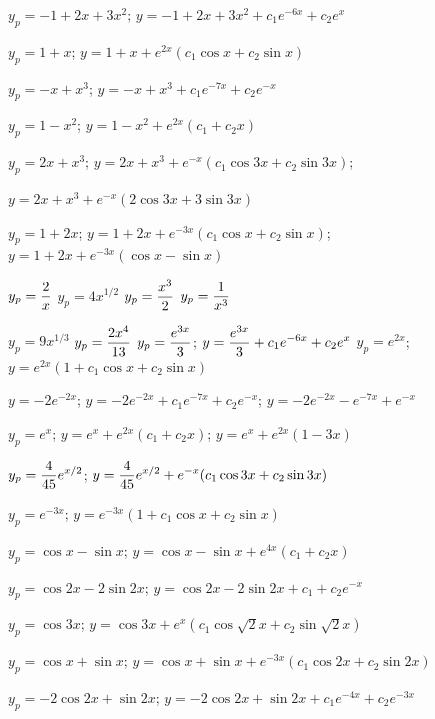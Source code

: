\medskip

 $y_{p}=-1+2x+3x^{2}$;    $y=-1+2x+3x^{2}+c_{1}e^{-6x}+c_{2}e^{x}$

 $y_{p}=1+x$;   $y=1+x+e^{2x}(c_{1}\cos x+c_{2}\sin x)$

 $y_{p}=-x+x^{3}$;    $y=-x+x^{3}+c_{1}e^{-7x}+c_{2}e^{-x}$

 $y_{p}=1-x^{2}$;    $y=1-x^{2}+e^{2x}(c_{1}+c_{2}x)$

 $y_{p}=2x+x^{3}$;   $y=2x+x^{3}+e^{-x}(c_{1}\cos3x+c_{2}\sin3x)$;

\quad\;  \;  $y=2x+x^{3}+e^{-x}(2\cos3x+3\sin3x)$

 $y_{p}=1+2x$;   $y=1+2x+e^{-3x}(c_{1}\cos x+c_{2}\sin x)$;
$y=1+2x+e^{-3x}(\cos x-\sin x)$

 $y_{p}=\displaystyle\frac{2}{x}$
 $y_{p}=4x^{1/2}$
 $y_{p}=\displaystyle\frac{x^{3}}{2}$
 $y_{p}=\displaystyle\frac{1}{x^{3}}$

 $y_{p}=9x^{1/3}$
 $y_{p}=\displaystyle\frac{2x^{4}}{13}$
 $y_{p}=\displaystyle\frac{e^{3x}}{3}$;
$y=\displaystyle\frac{e^{3x}}{3}+c_{1}e^{-6x}+c_{2}e^{x}$
 $y_{p}=e^{2x}$;    $y=e^{2x}(1+c_{1}\cos x+c_{2}\sin x)$

 $y=-2e^{-2x}$;
$y=-2e^{-2x}+c_{1}e^{-7x}+c_{2}e^{-x}$;
$y=-2e^{-2x}-e^{-7x}+e^{-x}$

 $y_{p}=e^{x}$;   $y=e^{x}+e^{2x}(c_{1}+c_{2}x)$;
$y=e^{x}+e^{2x}(1-3x)$

  $y_{p}=\displaystyle\frac{4}{45}e^{x/2}$;
$y=\displaystyle\frac{4}{45}e^{x/2}+e^{-x}(c_{1}\cos3x+c_{2}\sin3x)$

  $y_{p}=e^{-3x}$;
$y=e^{-3x}(1+c_{1}\cos x+c_{2}\sin x)$

 $y_{p}=\cos x-\sin x$;
$y=\cos x-\sin x+e^{4x}(c_{1}+c_{2}x)$

  $y_{p}=\cos2x-2\sin2x$;
 $y=\cos2x-2\sin2x+c_{1}+c_{2}e^{-x}$

 $y_{p}=\cos3x$;
$y=\cos3x+e^{x}(c_{1}\cos\sqrt{2}x+c_{2}\sin\sqrt{2}x)$

  $y_{p}=\cos x+\sin x$;
 $y=\cos x+\sin x+e^{-3x}(c_{1}\cos2x+c_{2}\sin2x)$

 $y_{p}=-2\cos2x+\sin2x$;
 $y=-2\cos2x+\sin2x+c_{1}e^{-4x}+c_{2}e^{-3x}$

